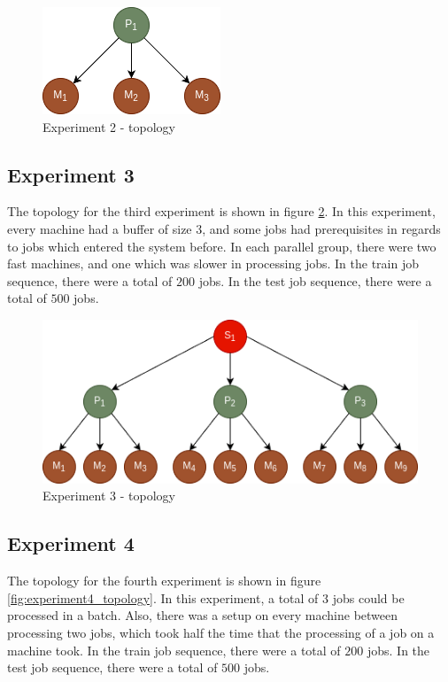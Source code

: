 \begin{figure}[!htbp]
	\centering
	\includegraphics[scale=0.6]{../images/experiment2_topology.png}
	\caption{Experiment 2 - topology}
    \label{fig:experiment2_topology}
\end{figure}

\subsection{Experiment 3}

The topology for the third experiment is shown in figure \ref{fig:experiment3_topology}. In this experiment, every machine had a buffer of size $3$, and some jobs had prerequisites in regards to jobs which entered the system before. In each parallel group, there were two fast machines, and one which was slower in processing jobs. In the train job sequence, there were a total of $200$ jobs. In the test job sequence, there were a total of $500$ jobs.

\begin{figure}[!htbp]
	\centering
	\includegraphics[scale=0.6]{../images/experiment3_topology.png}
	\caption{Experiment 3 - topology}
    \label{fig:experiment3_topology}
\end{figure}

\subsection{Experiment 4}

The topology for the fourth experiment is shown in figure \ref{fig:experiment4_topology}. In this experiment, a total of $3$ jobs could be processed in a batch. Also, there was a setup on every machine between processing two jobs, which took half the time that the processing of a job on a machine took. In the train job sequence, there were a total of $200$ jobs. In the test job sequence, there were a total of $500$ jobs.

